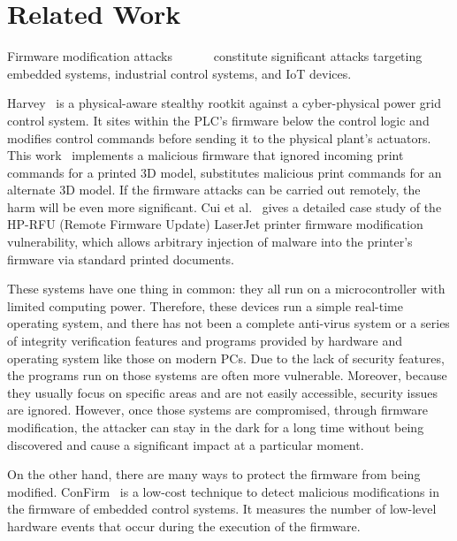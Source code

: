 \section{Related Work}
\label{sec:implant-relatedwork}


Firmware modification attacks~\cite{newman2011scada}~\cite{basnight2013firmware}~\cite{blanco2012one}~\cite{cui2013firmware}~\cite{konstantinou2015impact}~\cite{schulz2017nexmon} constitute significant attacks targeting embedded systems, industrial control systems, and IoT devices. 

Harvey~\cite{garcia2017hey} is a physical-aware stealthy rootkit against a cyber-physical power grid control system. It sites within the PLC's firmware below the control logic and modifies control commands before sending it to the physical plant's actuators. This work~\cite{moore2017implications} implements a malicious firmware that ignored incoming print commands for a printed 3D model, substitutes malicious print commands for an alternate 3D model.  If the firmware attacks can be carried out remotely, the harm will be even more significant. Cui et al.~\cite{cui2013firmware} gives a detailed case study of the HP-RFU (Remote Firmware Update) LaserJet printer firmware modification vulnerability, which allows arbitrary injection of malware into the printer's firmware via standard printed documents.

These systems have one thing in common: they all run on a microcontroller with limited computing power. Therefore, these devices run a simple real-time operating system, and there has not been a complete anti-virus system or a series of integrity verification features and programs provided by hardware and operating system like those on modern PCs. Due to the lack of security features, the programs run on those systems are often more vulnerable. Moreover, because they usually focus on specific areas and are not easily accessible, security issues are ignored. However, once those systems are compromised, through firmware modification, the attacker can stay in the dark for a long time without being discovered and cause a significant impact at a particular moment.

On the other hand, there are many ways to protect the firmware from being modified.
ConFirm~\cite{wang2015confirm} is a low-cost technique to detect malicious modifications in the firmware of embedded control systems. It measures the number of low-level hardware events that occur during the execution of the firmware.

